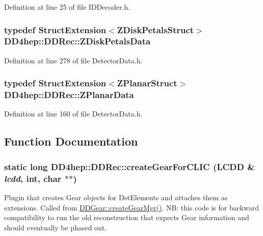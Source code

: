 Definition at line 25 of file IDDecoder.h.\hypertarget{namespace_d_d4hep_1_1_d_d_rec_a589fa302569ee79d91b34ff0d97d4a78}{
\subsubsection[{ZDiskPetalsData}]{\setlength{\rightskip}{0pt plus 5cm}typedef {\bf StructExtension}$<${\bf ZDiskPetalsStruct}$>$ {\bf DD4hep::DDRec::ZDiskPetalsData}}}
\label{namespace_d_d4hep_1_1_d_d_rec_a589fa302569ee79d91b34ff0d97d4a78}


Definition at line 278 of file DetectorData.h.\hypertarget{namespace_d_d4hep_1_1_d_d_rec_a33d4dff6a0b5ce47e490b050a3c5f69a}{
\subsubsection[{ZPlanarData}]{\setlength{\rightskip}{0pt plus 5cm}typedef {\bf StructExtension}$<${\bf ZPlanarStruct}$>$ {\bf DD4hep::DDRec::ZPlanarData}}}
\label{namespace_d_d4hep_1_1_d_d_rec_a33d4dff6a0b5ce47e490b050a3c5f69a}


Definition at line 160 of file DetectorData.h.

\subsection{Function Documentation}
\hypertarget{namespace_d_d4hep_1_1_d_d_rec_a8eda7f805466b45870d45a7eea090a98}{
\subsubsection[{createGearForCLIC}]{\setlength{\rightskip}{0pt plus 5cm}static long DD4hep::DDRec::createGearForCLIC (LCDD \& {\em lcdd}, \/  int, \/  char $\ast$$\ast$)}}
\label{namespace_d_d4hep_1_1_d_d_rec_a8eda7f805466b45870d45a7eea090a98}
Plugin that creates Gear objects for DetElements and attaches them as extensions. Called from \hyperlink{namespace_d_d4hep_aeaa49904e5fff3d47fa8fd9600655f3e}{DDGear::createGearMgr()}. NB: this code is for backward compatibility to run the old reconstruction that expects Gear information and should eventually be phased out.

